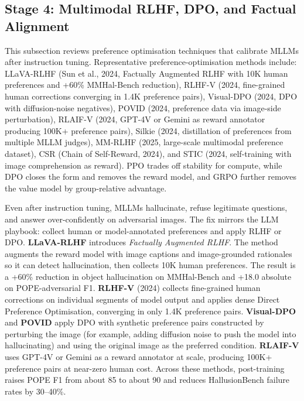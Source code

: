 \documentclass{article}
\begin{document}
\subsection{Stage 4: Multimodal RLHF, DPO, and Factual Alignment}\label{stage-4-multimodal-rlhf-dpo-and-factual-alignment}

This subsection reviews preference optimisation techniques that calibrate MLLMs after instruction tuning. Representative preference-optimisation methods include: LLaVA-RLHF (Sun et al., 2024, Factually Augmented RLHF with 10K human preferences and +60\% MMHal-Bench reduction), RLHF-V (2024, fine-grained human corrections converging in 1.4K preference pairs), Visual-DPO (2024, DPO with diffusion-noise negatives), POVID (2024, preference data via image-side perturbation), RLAIF-V (2024, GPT-4V or Gemini as reward annotator producing 100K+ preference pairs), Silkie (2024, distillation of preferences from multiple MLLM judges), MM-RLHF (2025, large-scale multimodal preference dataset), CSR (Chain of Self-Reward, 2024), and STIC (2024, self-training with image comprehension as reward). PPO trades off stability for compute, while DPO closes the form and removes the reward model, and GRPO further removes the value model by group-relative advantage.

Even after instruction tuning, MLLMs hallucinate, refuse legitimate questions, and answer over-confidently on adversarial images. The fix mirrors the LLM playbook: collect human or model-annotated preferences and apply RLHF or DPO. \textbf{LLaVA-RLHF} \citep{sun20242024} introduces \emph{Factually Augmented RLHF}. The method augments the reward model with image captions and image-grounded rationales so it can detect hallucination, then collects 10K human preferences. The result is a +60\% reduction in object hallucination on MMHal-Bench and +18.0 absolute on POPE-adversarial F1. \textbf{RLHF-V} (2024) collects fine-grained human corrections on individual segments of model output and applies dense Direct Preference Optimisation, converging in only 1.4K preference pairs. \textbf{Visual-DPO} and \textbf{POVID} apply DPO with synthetic preference pairs constructed by perturbing the image (for example, adding diffusion noise to push the model into hallucinating) and using the original image as the preferred condition. \textbf{RLAIF-V} uses GPT-4V or Gemini as a reward annotator at scale, producing 100K+ preference pairs at near-zero human cost. Across these methods, post-training raises POPE F1 from about 85 to about 90 and reduces HallusionBench failure rates by 30--40\%.
\end{document}

